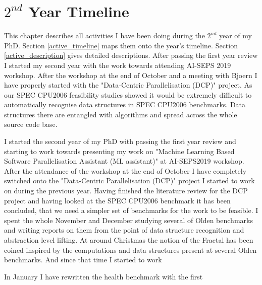 \documentclass[10pt,a4paper]{report}
\begin{document}
\chapter{$2^{nd}$ Year Timeline}
\quad This chapter describes all activities I have been doing during the $2^{nd}$ year of my PhD. Section \ref{active_timeline} maps them onto the year's timeline. Section \ref{active_description} gives detailed descriptions. After passing the first year review I started my second year with the work towards attending AI-SEPS 2019 workshop. After the workshop at the end of October and a meeting with Bjoern I have properly started with the "Data-Centric Parallelisation (DCP)" project. As our SPEC CPU2006 feasibility studies showed it would be extremely difficult to automatically recognise data structures in SPEC CPU2006 benchmarks. Data structures there are entangled with algorithms and spread across the whole source code base.          


I started the second year of my PhD with passing the first year review and starting to work towards presenting my work on "Machine Learning Based Software Parallelisation Assistant (ML assistant)" at AI-SEPS2019 workshop. After the attendance of the workshop at the end of October I have completely switched onto the "Data-Centric Parallelisation (DCP)" project I started to work on during the previous year. Having finished the literature review for the DCP project and having looked at the SPEC CPU2006 benchmark it has been concluded, that we need a simpler set of benchmarks for the work to be feasible. I spent the whole November and December studying several of Olden benchmarks and writing reports on them from the point of data structure recognition and abstraction level lifting. At around Christmas the notion of the Fractal has been coined inspired by the computations and data structures present at several Olden benchmarks. And since that time I started to work  


In January I have rewritten the health benchmark with the first            


   
\end{document}
